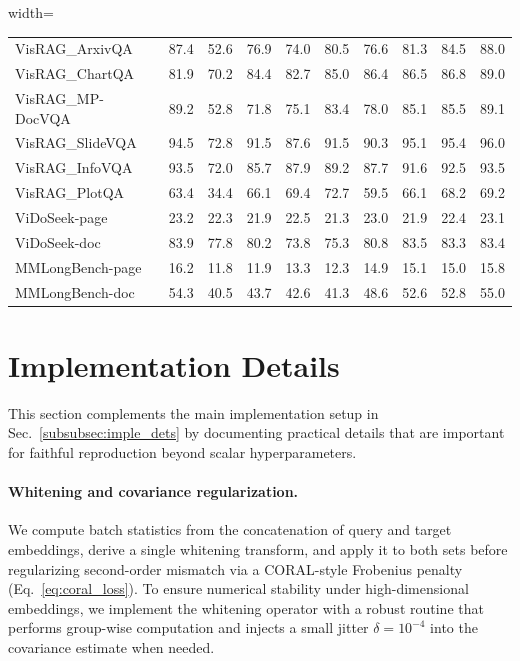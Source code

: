 \begin{table}[!t]
\begin{adjustbox}{width=\textwidth}
\begin{tabular}{l|ccccccccc}
        VisRAG\_ArxivQA & 87.4 & 52.6 & 76.9 & 74.0 & 80.5 & 76.6 & 81.3 & 84.5 & 88.0 \\
        VisRAG\_ChartQA & 81.9 & 70.2 & 84.4 & 82.7 & 85.0 & 86.4 & 86.5 & 86.8 & 89.0 \\
        VisRAG\_MP-DocVQA & 89.2 & 52.8 & 71.8 & 75.1 & 83.4 & 78.0 & 85.1 & 85.5 & 89.1 \\
        VisRAG\_SlideVQA & 94.5 & 72.8 & 91.5 & 87.6 & 91.5 & 90.3 & 95.1 & 95.4 & 96.0 \\
        VisRAG\_InfoVQA & 93.5 & 72.0 & 85.7 & 87.9 & 89.2 & 87.7 & 91.6 & 92.5 & 93.5 \\
        VisRAG\_PlotQA & 63.4 & 34.4 & 66.1 & 69.4 & 72.7 & 59.5 & 66.1 & 68.2 & 69.2 \\
        ViDoSeek-page & 23.2 & 22.3 & 21.9 & 22.5 & 21.3 & 23.0 & 21.9 & 22.4 & 23.1 \\
        ViDoSeek-doc & 83.9 & 77.8 & 80.2 & 73.8 & 75.3 & 80.8 & 83.5 & 83.3 & 83.4 \\
        MMLongBench-page & 16.2 & 11.8 & 11.9 & 13.3 & 12.3 & 14.9 & 15.1 & 15.0 & 15.8 \\
        MMLongBench-doc & 54.3 & 40.5 & 43.7 & 42.6 & 41.3 & 48.6 & 52.6 & 52.8 & 55.0 \\
        \bottomrule
    \end{tabular}
    \end{adjustbox}
\end{table}



\section{Implementation Details}
\label{app:impl_more}

This section complements the main implementation setup in Sec.~\ref{subsubsec:imple_dets} by documenting practical details that are important for faithful reproduction beyond scalar hyperparameters.

\paragraph{Whitening and covariance regularization.}
We compute batch statistics from the concatenation of query and target embeddings, derive a single whitening transform, and apply it to both sets before regularizing second-order mismatch via a CORAL-style Frobenius penalty (Eq.~\ref{eq:coral_loss}).
To ensure numerical stability under high-dimensional embeddings, we implement the whitening operator with a robust routine that performs group-wise computation and injects a small jitter $\delta=10^{-4}$ into the covariance estimate when needed.


